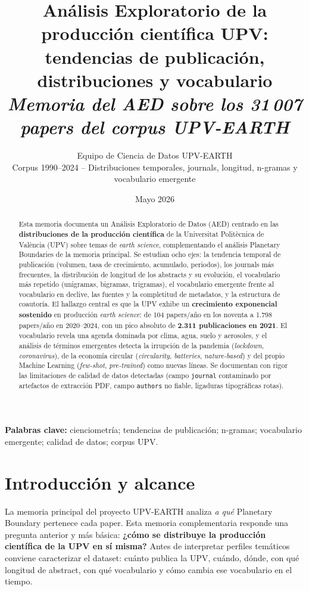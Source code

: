 \documentclass[11pt,a4paper]{article}
\title{\vspace*{-1.2cm}
\Large\bfseries\textcolor{accent}{Análisis Exploratorio de la producción científica UPV:\\
tendencias de publicación, distribuciones y vocabulario}\\[0.4em]
\large\textit{Memoria del AED sobre los 31\,007 papers del corpus UPV-EARTH}}
\author{\normalsize Equipo de Ciencia de Datos UPV-EARTH \\
\small Corpus 1990--2024 -- Distribuciones temporales, journals, longitud, n-gramas y vocabulario emergente}
\date{Mayo 2026}
\newcommand{\good}[1]{\textbf{\textcolor{accent}{#1}}}
\begin{document}
\maketitle
\thispagestyle{empty}
\vspace*{-1em}

\begin{abstract}
\noindent
Esta memoria documenta un Análisis Exploratorio de Datos (AED) centrado en las \textbf{distribuciones de la producción científica} de la Universitat Politècnica de València (UPV) sobre temas de \emph{earth science}, complementando el análisis Planetary Boundaries de la memoria principal. Se estudian ocho ejes: la tendencia temporal de publicación (volumen, tasa de crecimiento, acumulado, periodos), los journals más frecuentes, la distribución de longitud de los abstracts y su evolución, el vocabulario más repetido (unigramas, bigramas, trigramas), el vocabulario emergente frente al vocabulario en declive, las fuentes y la completitud de metadatos, y la estructura de coautoría. El hallazgo central es que la UPV exhibe un \textbf{crecimiento exponencial sostenido} en producción \emph{earth science}: de 104 papers/año en los noventa a 1.798 papers/año en 2020--2024, con un pico absoluto de \good{2.311 publicaciones en 2021}. El vocabulario revela una agenda dominada por clima, agua, suelo y aerosoles, y el análisis de términos emergentes detecta la irrupción de la pandemia (\emph{lockdown}, \emph{coronavirus}), de la economía circular (\emph{circularity}, \emph{batteries}, \emph{nature-based}) y del propio Machine Learning (\emph{few-shot}, \emph{pre-trained}) como nuevas líneas. Se documentan con rigor las limitaciones de calidad de datos detectadas (campo \texttt{journal} contaminado por artefactos de extracción PDF, campo \texttt{authors} no fiable, ligaduras tipográficas rotas).
\end{abstract}

\medskip
\noindent\textbf{Palabras clave:} cienciometría; tendencias de publicación; n-gramas; vocabulario emergente; calidad de datos; corpus UPV.

\tableofcontents
\clearpage

\section{Introducción y alcance}

La memoria principal del proyecto UPV-EARTH analiza \emph{a qué} Planetary Boundary pertenece cada paper. Esta memoria complementaria responde una pregunta anterior y más básica: \textbf{¿cómo se distribuye la producción científica de la UPV en sí misma?} Antes de interpretar perfiles temáticos conviene caracterizar el dataset: cuánto publica la UPV, cuándo, dónde, con qué longitud de abstract, con qué vocabulario y cómo cambia ese vocabulario en el tiempo.
\end{document}
